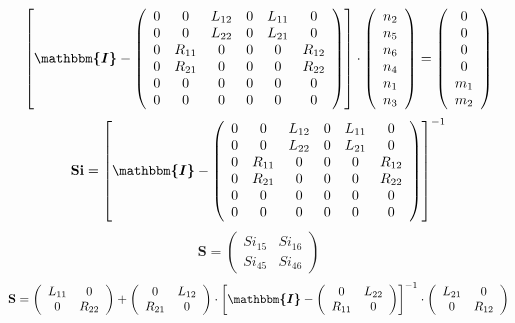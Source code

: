 \[ \left[ \boldsymbol{\mathbbm{I}}  - \left(\begin{array}{cccccc} 0 &
0 & L_{12} & 0 & L_{11} & 0 \\ 0 & 0 & L_{22} & 0 & L_{21} & 0 \\ 0 &
R_{11} & 0 & 0 & 0 & R_{12} \\ 0 & R_{21} & 0 & 0 & 0 & R_{22} \\ 0 &
0 & 0 & 0 & 0 & 0 \\ 0 & 0 & 0 & 0 & 0 & 0 \end{array}\right)\right]
\cdot \left(\begin{array}{c} n_{2} \\ n_{5} \\ n_{6} \\ n_{4} \\ n_{1}
\\ n_{3} \end{array}\right) = \left(\begin{array}{c} 0 \\ 0 \\ 0 \\ 0
\\ m_{1} \\ m_{2} \end{array}\right) \]
\[ \mathbf{Si} = \left[ \boldsymbol{\mathbbm{I}}  -
\left(\begin{array}{cccccc} 0 & 0 & L_{12} & 0 & L_{11} & 0 \\ 0 & 0 &
L_{22} & 0 & L_{21} & 0 \\ 0 & R_{11} & 0 & 0 & 0 & R_{12} \\ 0 &
R_{21} & 0 & 0 & 0 & R_{22} \\ 0 & 0 & 0 & 0 & 0 & 0 \\ 0 & 0 & 0 & 0
& 0 & 0 \end{array}\right) \right]^{-1} \]
\[ \mathbf{S} = \left(\begin{array}{cc} Si_{15} & Si_{16} \\ Si_{45} &
Si_{46} \end{array}\right) \]
\[ \mathbf{S} = \left(\begin{array}{cc} L_{11} & 0 \\ 0 & R_{22}
\end{array}\right) + \left(\begin{array}{cc} 0 & L_{12} \\ R_{21} & 0
\end{array}\right) \cdot \left[ \boldsymbol{\mathbbm{I}}  -
\left(\begin{array}{cc} 0 & L_{22} \\ R_{11} & 0 \end{array}\right)
\right]^{-1} \cdot\left(\begin{array}{cc} L_{21} & 0 \\ 0 & R_{12}
\end{array}\right) \]
